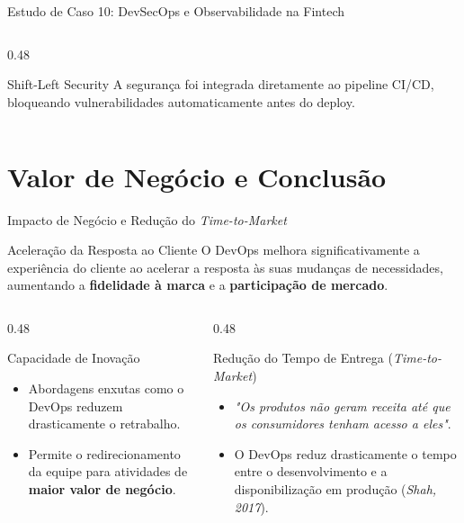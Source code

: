 \documentclass[aspectratio=169, 9pt]{beamer}
\begin{document}
\begin{frame}{Estudo de Caso 10: DevSecOps e Observabilidade na Fintech}
\begin{columns}[T]
    \begin{column}{0.48\textwidth}
      \begin{alertblock}{Shift-Left Security}
        A segurança foi integrada diretamente ao pipeline CI/CD, bloqueando vulnerabilidades automaticamente antes do deploy.
      \end{alertblock}
    \end{column}
  \end{columns}
\end{frame}

\section{Valor de Negócio e Conclusão}

\begin{frame}{Impacto de Negócio e Redução do \textit{Time-to-Market}}
  \begin{block}{Aceleração da Resposta ao Cliente}
    O DevOps melhora significativamente a experiência do cliente ao acelerar a resposta às suas mudanças de necessidades, aumentando a \textbf{fidelidade à marca} e a \textbf{participação de mercado}.
  \end{block}

  \vspace{0.3cm}

  \begin{columns}[T]
    \begin{column}{0.48\textwidth}
      \begin{exampleblock}{Capacidade de Inovação}
        \begin{itemize}
          \item Abordagens enxutas como o DevOps reduzem drasticamente o retrabalho.
          \item Permite o redirecionamento da equipe para atividades de \textbf{maior valor de negócio}.
        \end{itemize}
      \end{exampleblock}
    \end{column}

    \begin{column}{0.48\textwidth}
      \begin{alertblock}{Redução do Tempo de Entrega (\textit{Time-to-Market})}
        \begin{itemize}
          \item \textit{"Os produtos não geram receita até que os consumidores tenham acesso a eles"}.
          \item O DevOps reduz drasticamente o tempo entre o desenvolvimento e a disponibilização em produção (\textit{Shah, 2017}).
        \end{itemize}
      \end{alertblock}
    \end{column}
  \end{columns}
\end{frame}
\end{document}
